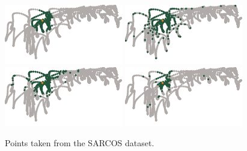 \documentclass[review,supplement,onefignum,onetabnum]{siamonline220329}
\begin{document}
\begin{figure}[H]
  \centering
  \includegraphics{figures/precompiled/sarcos3/points_1.pdf}%
  \quad
  \includegraphics{figures/precompiled/sarcos3/points_2.pdf}%
  \quad
  \includegraphics{figures/precompiled/sarcos3/points_3.pdf}%
  \quad
  \includegraphics{figures/precompiled/sarcos3/points_4.pdf}%
  \caption{
    Points taken from the SARCOS dataset.
  }
\end{figure}



\end{document}
